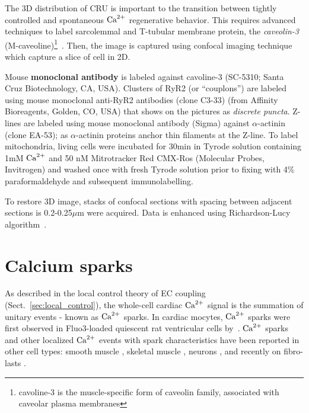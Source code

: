 The 3D distribution of CRU is important to the transition between
tightly controlled and spontaneous ${\text{Ca}^{2+}}$ regenerative behavior. This
requires advanced techniques to label sarcolemmal and T-tubular
membrane protein, the {\it caveolin-3}
(M-caveoline)\footnote{cavoline-3 is the muscle-specific form of
  caveolin family, associated with caveolar plasma
  membranes}~\citep{chen-izu2006tdd,
  soeller2008}.
Then, the image is captured using confocal imaging technique which
capture a slice of cell in 2D.

\begin{framed}
  Mouse {\bf monoclonal antibody} is labeled against cavoline-3
  (SC-5310; Santa Cruz Biotechnology, CA, USA). Clusters of RyR2 (or
  ``couplons'') are labeled using mouse monoclonal anti-RyR2
  antibodies (clone C3-33) (from Affinity Bioreagents, Golden, CO,
  USA) that shows on the pictures as {\it discrete puncta}. Z-lines
  are labeled using mouse monoclonal antibody (Sigma) against
  $\alpha$-actinin (clone EA-53); as $\alpha$-actinin proteins anchor
  thin filaments at the Z-line. To label mitochondria, living cells
  were incubated for 30min in Tyrode solution containing 1mM ${\text{Ca}^{2+}}$ and
  50 nM Mitrotracker Red CMX-Ros (Molecular Probes, Invitrogen) and
  washed once with fresh Tyrode solution prior to fixing with 4\%
  paraformaldehyde and subsequent immunolabelling.
\end{framed}

To restore 3D image, stacks of confocal sections  with spacing between
adjacent sections is 0.2-0.25$\mu$m were acquired. Data is enhanced
using Richardson-Lucy algorithm~\citep{soeller1999}.


\section{Calcium sparks}
\label{sec:ceca2+-sparks}

As described in the local control theory of EC coupling
(Sect.~\ref{sec:local_control}), the whole-cell cardiac ${\text{Ca}^{2+}}$ signal is the
summation of unitary events - known as ${\text{Ca}^{2+}}$ sparks. In cardiac mocytes, ${\text{Ca}^{2+}}$
sparks were first observed in Fluo3-loaded quiescent rat ventricular cells
by~\citep{cheng1993cse}. ${\text{Ca}^{2+}}$ sparks and other localized ${\text{Ca}^{2+}}$ events with
spark characteristics have been reported in other cell types: smooth muscle
\citep{nelson1995}, skeletal muscle \citep{klein1996, tsugorka1995, wang2005},
neurons \citep{ouyang2005}, and recently on fibro-lasts \citep{wei2009}.

